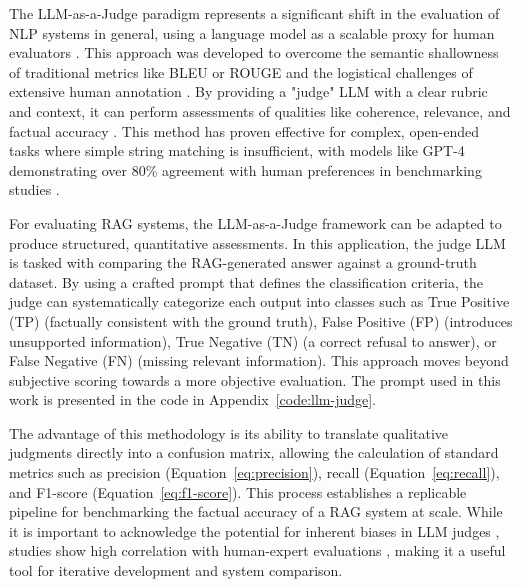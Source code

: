             The LLM-as-a-Judge paradigm represents a significant shift in the evaluation of NLP systems in general, using a language model as a scalable proxy for human evaluators \citep{li2024llmsasjudgescomprehensivesurveyllmbased}. 
            This approach was developed to overcome the semantic shallowness of traditional metrics like BLEU or ROUGE and the logistical challenges of extensive human annotation \citep{Zheng2023}. 
            By providing a "judge" LLM with a clear rubric and context, it can perform assessments of qualities like coherence, relevance, and factual accuracy \citep{li2024llmsasjudgescomprehensivesurveyllmbased}. 
            This method has proven effective for complex, open-ended tasks where simple string matching is insufficient, with models like GPT-4 demonstrating over 80\% agreement with human preferences in benchmarking studies \citep{Zheng2023}.

            For evaluating RAG systems, the LLM-as-a-Judge framework can be adapted to produce structured, quantitative assessments. 
            In this application, the judge LLM is tasked with comparing the RAG-generated answer against a ground-truth dataset.
            By using a crafted prompt that defines the classification criteria, the judge can systematically categorize each output into classes such as True Positive (TP) (factually consistent with the ground truth), False Positive (FP) (introduces unsupported information), True Negative (TN) (a correct refusal to answer), or False Negative (FN) (missing relevant information). This approach moves beyond subjective scoring towards a more objective evaluation. The prompt used in this work is presented in the code in Appendix~\ref{code:llm-judge}.

            The advantage of this methodology is its ability to translate qualitative judgments directly into a confusion matrix, allowing the calculation of standard metrics such as precision (Equation~\ref{eq:precision}), recall (Equation~\ref{eq:recall}), and F1-score (Equation~\ref{eq:f1-score}). This process establishes a replicable pipeline for benchmarking the factual accuracy of a RAG system at scale. While it is important to acknowledge the potential for inherent biases in LLM judges \citep{Gu2025}, studies show high correlation with human-expert evaluations \citep{li2024llmsasjudgescomprehensivesurveyllmbased}, making it a useful tool for iterative development and system comparison.
